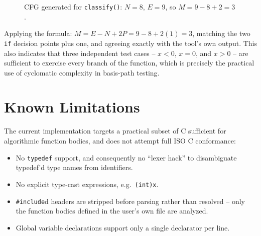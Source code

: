 \documentclass[11pt]{article}
\begin{document}
\begin{figure}[h]
\centering
{}
\caption{CFG generated for \texttt{classify()}: $N=8$, $E=9$, so $M = 9 - 8 + 2 = 3$.}
\label{fig:classify}
\end{figure}

Applying the formula: $M = E - N + 2P = 9 - 8 + 2(1) = 3$, matching the two \texttt{if} decision points plus one, and agreeing exactly with the tool's own output. This also indicates that three independent test cases -- $x<0$, $x=0$, and $x>0$ -- are sufficient to exercise every branch of the function, which is precisely the practical use of cyclomatic complexity in basis-path testing.

\section{Known Limitations}
The current implementation targets a practical subset of C sufficient for algorithmic function bodies, and does not attempt full ISO C conformance:
\begin{itemize}
    \item No \texttt{typedef} support, and consequently no ``lexer hack'' to disambiguate typedef'd type names from identifiers.
    \item No explicit type-cast expressions, e.g.\ \texttt{(int)x}.
    \item \texttt{\#include}d headers are stripped before parsing rather than resolved -- only the function bodies defined in the user's own file are analyzed.
    \item Global variable declarations support only a single declarator per line.
\end{itemize}
\end{document}
